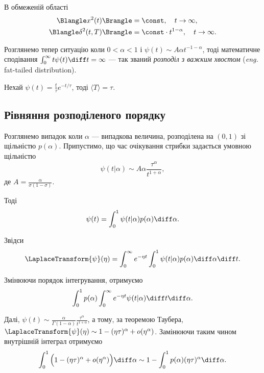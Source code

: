 \begin{remark}
    В обмеженій області
    \begin{align}
        \Blangle x^2(t) \Brangle &= \const, \quad t \to \infty, \\
        \Blangle \delta^2(t, T) \Brangle &= \const \cdot t^{1 - \alpha}, \quad t \to \infty.
    \end{align}
\end{remark}

Розглянемо тепер ситуацію коли $0 < \alpha < 1$ і $\psi(t) \sim A \alpha t^{-1 - \alpha}$, тоді математичне сподівання $\int_0^\infty t \psi(t) \diff t = \infty$ --- так званий \textit{розподіл з важким хвостом} (\textit{eng.} fat-tailed distribution).

\begin{example}
    Нехай $\psi(t) = \frac{t}{\tau} e^{-t / \tau}$, тоді $\langle T \rangle = \tau$.
\end{example}

\subsection{Рівняння розподіленого порядку}

Розглянемо випадок коли $\alpha$ --- випадкова величина, розподілена на $(0, 1)$ зі щільністю $p(\alpha)$. Припустимо, що час очікування стрибки задається умовною щільністю
\begin{equation}
    \psi(t|\alpha) \sim A \alpha \frac{\tau^\alpha}{t^{1 + \alpha}},
\end{equation}
де $A = \frac{\alpha}{\sigma (1 - \sigma)}$. \medskip

Тоді
\begin{equation}
    \psi(t) = \int_0^1 \psi(t|\alpha) p(\alpha) \diff \alpha.
\end{equation}

Звідси
\begin{equation}
    \LaplaceTransform{\psi}(\eta)
    = \int_0^\infty e^{-\eta t} \int_0^1 \psi(t|\alpha) p(\alpha) \diff \alpha \diff t.
\end{equation}

Змінюючи порядок інтегрування, отримуємо
\begin{equation}
    \int_0^1 p(\alpha) \int_0^\infty e^{-\eta t} \psi(t|\alpha) \diff t \diff \alpha.
\end{equation}

Далі, $\psi(t) \sim \frac{\alpha}{\Gamma(1 - \alpha)} \frac{\tau^\alpha}{t^{1 + \alpha}}$, а тому, за теоремою Таубера, $\LaplaceTransform{\psi}(\eta) \sim 1 - (\eta \tau)^\alpha + o(\eta^\alpha)$. Замінюючи таким чином внутрішній інтеграл отримуємо
\begin{equation}
    \int_0^1 \Big( 1 - (\eta \tau)^\alpha + o(\eta^\alpha) \Big) \diff \alpha
    \sim 1 - \int_0^1 p(\alpha) (\eta \tau)^\alpha \diff \alpha.
\end{equation}

